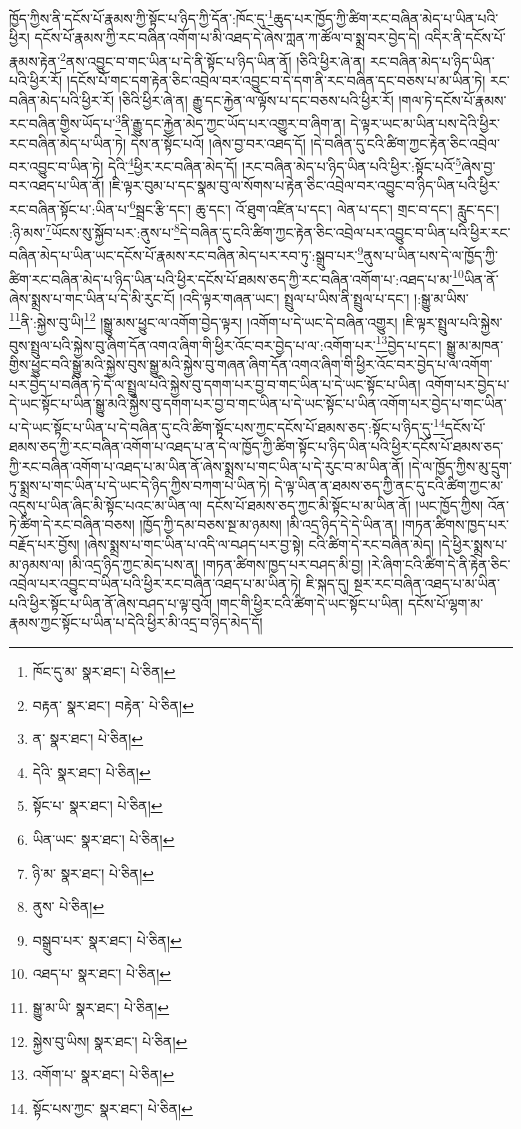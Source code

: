 ཁྱོད་ཀྱིས་ནི་དངོས་པོ་རྣམས་ཀྱི་སྟོང་པ་ཉིད་ཀྱི་དོན་:ཁོང་དུ་\footnote{ཁོང་དུ་མ་  སྣར་ཐང་།  པེ་ཅིན། }ཆུད་པར་ཁྱོད་ཀྱི་ཚིག་རང་བཞིན་མེད་པ་ཡིན་པའི་ཕྱིར། དངོས་པོ་རྣམས་ཀྱི་རང་བཞིན་འགོག་པ་མི་འཐད་དེ་ཞེས་ཀླན་ཀ་ཚོལ་བ་སྨྲ་བར་བྱེད་དེ། འདིར་ནི་དངོས་པོ་རྣམས་རྟེན་\footnote{བརྟན་  སྣར་ཐང་། བརྟེན་  པེ་ཅིན། }ནས་འབྱུང་བ་གང་ཡིན་པ་དེ་ནི་སྟོང་པ་ཉིད་ཡིན་ནོ། །ཅིའི་ཕྱིར་ཞེ་ན། རང་བཞིན་མེད་པ་ཉིད་ཡིན་པའི་ཕྱིར་རོ། །དངོས་པོ་གང་དག་རྟེན་ཅིང་འབྲེལ་བར་འབྱུང་བ་དེ་དག་ནི་རང་བཞིན་དང་བཅས་པ་མ་ཡིན་ཏེ། རང་བཞིན་མེད་པའི་ཕྱིར་རོ། །ཅིའི་ཕྱིར་ཞེ་ན། རྒྱུ་དང་རྐྱེན་ལ་ལྟོས་པ་དང་བཅས་པའི་ཕྱིར་རོ། །གལ་ཏེ་དངོས་པོ་རྣམས་རང་བཞིན་གྱིས་ཡོད་པ་\footnote{ན་  སྣར་ཐང་།  པེ་ཅིན། }ནི་རྒྱུ་དང་རྐྱེན་མེད་ཀྱང་ཡོད་པར་འགྱུར་བ་ཞིག་ན། དེ་ལྟར་ཡང་མ་ཡིན་པས་དེའི་ཕྱིར་རང་བཞིན་མེད་པ་ཡིན་ཏེ། དེས་ན་སྟོང་པའོ། །ཞེས་བྱ་བར་འཐད་དོ། །དེ་བཞིན་དུ་ངའི་ཚིག་ཀྱང་རྟེན་ཅིང་འབྲེལ་བར་འབྱུང་བ་ཡིན་ཏེ། དེའི་\footnote{དེའི་  སྣར་ཐང་།  པེ་ཅིན། }ཕྱིར་རང་བཞིན་མེད་དོ། །རང་བཞིན་མེད་པ་ཉིད་ཡིན་པའི་ཕྱིར་:སྟོང་པའོ་\footnote{སྟོང་པ་  སྣར་ཐང་།  པེ་ཅིན། }ཞེས་བྱ་བར་འཐད་པ་ཡིན་ནོ། །ཇི་ལྟར་བུམ་པ་དང་སྣམ་བུ་ལ་སོགས་པ་རྟེན་ཅིང་འབྲེལ་བར་འབྱུང་བ་ཉིད་ཡིན་པའི་ཕྱིར་རང་བཞིན་སྟོང་པ་:ཡིན་པ་\footnote{ཡིན་ཡང་  སྣར་ཐང་།  པེ་ཅིན། }སྦྲང་རྩི་དང་། ཆུ་དང་། འོ་ཐུག་འཛིན་པ་དང་། ལེན་པ་དང་། གྲང་བ་དང་། རླུང་དང་། :ཉི་མས་\footnote{ཉི་མ་  སྣར་ཐང་།  པེ་ཅིན། }ཡོངས་སུ་སྐྱོབ་པར་:ནུས་པ་\footnote{ནུས་  པེ་ཅིན། }དེ་བཞིན་དུ་ངའི་ཚིག་ཀྱང་རྟེན་ཅིང་འབྲེལ་པར་འབྱུང་བ་ཡིན་པའི་ཕྱིར་རང་བཞིན་མེད་པ་ཡིན་ཡང་དངོས་པོ་རྣམས་རང་བཞིན་མེད་པར་རབ་ཏུ་:སྒྲུབ་པར་\footnote{བསྒྲུབ་པར་  སྣར་ཐང་།  པེ་ཅིན། }ནུས་པ་ཡིན་པས་དེ་ལ་ཁྱོད་ཀྱི་ཚིག་རང་བཞིན་མེད་པ་ཉིད་ཡིན་པའི་ཕྱིར་དངོས་པོ་ཐམས་ཅད་ཀྱི་རང་བཞིན་འགོག་པ་:འཐད་པ་མ་\footnote{འཐད་པ་  སྣར་ཐང་།  པེ་ཅིན། }ཡིན་ནོ་ཞེས་སྨྲས་པ་གང་ཡིན་པ་དེ་མི་རུང་ངོ། །འདི་ལྟར་གཞན་ཡང་། སྤྲུལ་པ་ཡིས་ནི་སྤྲུལ་པ་དང་། །:སྒྱུ་མ་ཡིས་\footnote{སྒྱུ་མ་ཡི་  སྣར་ཐང་།  པེ་ཅིན། }ནི་:སྐྱེས་བུ་ཡི།\footnote{སྐྱེས་བུ་ཡིས།  སྣར་ཐང་།  པེ་ཅིན། } །སྒྱུ་མས་ཕྱུང་ལ་འགོག་བྱེད་ལྟར། །འགོག་པ་དེ་ཡང་དེ་བཞིན་འགྱུར། །ཇི་ལྟར་སྤྲུལ་པའི་སྐྱེས་བུས་སྤྲུལ་པའི་སྐྱེས་བུ་ཞིག་དོན་འགའ་ཞིག་གི་ཕྱིར་འོང་བར་བྱེད་པ་ལ་:འགོག་པར་\footnote{འགོག་པ་  སྣར་ཐང་།  པེ་ཅིན། }བྱེད་པ་དང་། སྒྱུ་མ་མཁན་གྱིས་ཕྱུང་བའི་སྒྱུ་མའི་སྐྱེས་བུས་སྒྱུ་མའི་སྐྱེས་བུ་གཞན་ཞིག་དོན་འགའ་ཞིག་གི་ཕྱིར་འོང་བར་བྱེད་པ་ལ་འགོག་པར་བྱེད་པ་བཞིན་ཏེ་དེ་ལ་སྤྲུལ་པའི་སྐྱེས་བུ་དགག་པར་བྱ་བ་གང་ཡིན་པ་དེ་ཡང་སྟོང་པ་ཡིན། འགོག་པར་བྱེད་པ་དེ་ཡང་སྟོང་པ་ཡིན་སྒྱུ་མའི་སྐྱེས་བུ་དགག་པར་བྱ་བ་གང་ཡིན་པ་དེ་ཡང་སྟོང་པ་ཡིན་འགོག་པར་བྱེད་པ་གང་ཡིན་པ་དེ་ཡང་སྟོང་པ་ཡིན་པ་དེ་བཞིན་དུ་ངའི་ཚིག་སྟོང་པས་ཀྱང་དངོས་པོ་ཐམས་ཅད་:སྟོང་པ་ཉིད་དུ་\footnote{སྟོང་པས་ཀྱང་  སྣར་ཐང་།  པེ་ཅིན། }དངོས་པོ་ཐམས་ཅད་ཀྱི་རང་བཞིན་འགོག་པ་འཐད་པ་ན་དེ་ལ་ཁྱོད་ཀྱི་ཚིག་སྟོང་པ་ཉིད་ཡིན་པའི་ཕྱིར་དངོས་པོ་ཐམས་ཅད་ཀྱི་རང་བཞིན་འགོག་པ་འཐད་པ་མ་ཡིན་ནོ་ཞེས་སྨྲས་པ་གང་ཡིན་པ་དེ་རུང་བ་མ་ཡིན་ནོ། །དེ་ལ་ཁྱོད་ཀྱིས་མུ་དྲུག་ཏུ་སྨྲས་པ་གང་ཡིན་པ་དེ་ཡང་དེ་ཉིད་ཀྱིས་བཀག་པ་ཡིན་ཏེ། དེ་ལྟ་ཡིན་ན་ཐམས་ཅད་ཀྱི་ནང་དུ་ངའི་ཚིག་ཀྱང་མ་འདུས་པ་ཡིན་ཞིང་མི་སྟོང་པའང་མ་ཡིན་ལ། དངོས་པོ་ཐམས་ཅད་ཀྱང་མི་སྟོང་པ་མ་ཡིན་ནོ། །ཡང་ཁྱོད་ཀྱིས། འོན་ཏེ་ཚིག་དེ་རང་བཞིན་བཅས། །ཁྱོད་ཀྱི་དམ་བཅས་སྔ་མ་ཉམས། །མི་འདྲ་ཉིད་དེ་དེ་ཡིན་ན། །གཏན་ཚིགས་ཁྱད་པར་བརྗོད་པར་བྱོས། །ཞེས་སྨྲས་པ་གང་ཡིན་པ་འདི་ལ་བཤད་པར་བྱ་སྟེ། ངའི་ཚིག་དེ་རང་བཞིན་མེད། །དེ་ཕྱིར་སྨྲས་པ་མ་ཉམས་ལ། །མི་འདྲ་ཉིད་ཀྱང་མེད་པས་ན། །གཏན་ཚིགས་ཁྱད་པར་བཤད་མི་བྱ། །རེ་ཞིག་ངའི་ཚིག་དེ་ནི་རྟེན་ཅིང་འབྲེལ་པར་འབྱུང་བ་ཡིན་པའི་ཕྱིར་རང་བཞིན་འཐད་པ་མ་ཡིན་ཏེ། ཇི་སྐད་དུ། སྔར་རང་བཞིན་འཐད་པ་མ་ཡིན་པའི་ཕྱིར་སྟོང་པ་ཡིན་ནོ་ཞེས་བཤད་པ་ལྟ་བུའོ། །གང་གི་ཕྱིར་ངའི་ཚིག་དེ་ཡང་སྟོང་པ་ཡིན། དངོས་པོ་ལྷག་མ་རྣམས་ཀྱང་སྟོང་པ་ཡིན་པ་དེའི་ཕྱིར་མི་འདྲ་བ་ཉིད་མེད་དོ། 